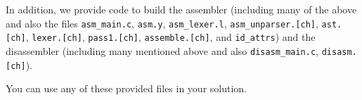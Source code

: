 \documentclass[11pt,letterpaper]{article}
\begin{document}
In addition, we provide code to build the assembler (including many of
the above and also the files
\lstinline!asm_main.c!, \lstinline!asm.y!, \lstinline!asm_lexer.l!,
\lstinline!asm_unparser.[ch]!, \lstinline!ast.[ch]!,
\lstinline!lexer.[ch]!, \lstinline!pass1.[ch]!,
\lstinline!assemble.[ch]!, and \lstinline!id_attrs!)
and the disassembler (including many mentioned above and also
\lstinline!disasm_main.c!, \lstinline!disasm.[ch]!).

You can use any of these provided files in your solution.


\end{document}
